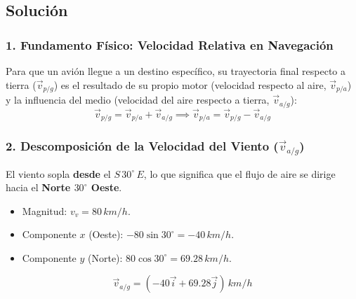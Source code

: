 \documentclass[12pt, a4paper]{article}
\begin{document}
\begin{center}
\end{center}

\subsection*{Solución}

\subsubsection*{1. Fundamento Físico: Velocidad Relativa en Navegación}

Para que un avión llegue a un destino específico, su trayectoria final respecto a tierra ($\vec{v}_{p/g}$) es el resultado de su propio motor (velocidad respecto al aire, $\vec{v}_{p/a}$) y la influencia del medio (velocidad del aire respecto a tierra, $\vec{v}_{a/g}$):
\begin{equation}
    \vec{v}_{p/g} = \vec{v}_{p/a} + \vec{v}_{a/g} \implies \vec{v}_{p/a} = \vec{v}_{p/g} - \vec{v}_{a/g}
\end{equation}

\subsubsection*{2. Descomposición de la Velocidad del Viento ($\vec{v}_{a/g}$)}

El viento sopla \textbf{desde} el $S \, 30^\circ \, E$, lo que significa que el flujo de aire se dirige hacia el \textbf{Norte $30^\circ$ Oeste}.
\begin{itemize}
    \item Magnitud: $v_{v} = 80 \, \si{km/h}$.
    \item Componente $x$ (Oeste): $-80 \sin 30^\circ = -40 \, \si{km/h}$.
    \item Componente $y$ (Norte): $80 \cos 30^\circ = 69.28 \, \si{km/h}$.
\end{itemize}
\begin{equation}
    \vec{v}_{a/g} = (-40 \vec{i} + 69.28 \vec{j}) \, \si{km/h}
\end{equation}
\end{document}
